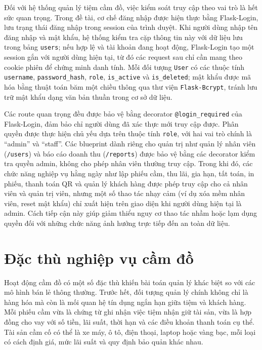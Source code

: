 \documentclass[13pt,a4paper]{extreport}
\begin{document}
Đối với hệ thống quản lý tiệm cầm đồ, việc kiểm soát truy cập theo vai trò là hết sức quan trọng. Trong đề tài, cơ chế đăng nhập được hiện thực bằng Flask-Login, lưu trạng thái đăng nhập trong session của trình duyệt. Khi người dùng nhập tên đăng nhập và mật khẩu, hệ thống kiểm tra cặp thông tin này với dữ liệu lưu trong bảng \texttt{users}; nếu hợp lệ và tài khoản đang hoạt động, Flask-Login tạo một session gắn với người dùng hiện tại, từ đó các request sau chỉ cần mang theo cookie phiên để chứng minh danh tính. Mỗi đối tượng \texttt{User} có các thuộc tính \texttt{username}, \texttt{password\_hash}, \texttt{role}, \texttt{is\_active} và \texttt{is\_deleted}; mật khẩu được mã hóa bằng thuật toán băm một chiều thông qua thư viện \texttt{Flask-Bcrypt}, tránh lưu trữ mật khẩu dạng văn bản thuần trong cơ sở dữ liệu.

Các route quan trọng đều được bảo vệ bằng decorator \texttt{@login\_required} của Flask-Login, đảm bảo chỉ người dùng đã xác thực mới truy cập được. Phân quyền được thực hiện chủ yếu dựa trên thuộc tính \texttt{role}, với hai vai trò chính là ``admin'' và ``staff''. Các blueprint dành riêng cho quản trị như quản lý nhân viên (\texttt{/users}) và báo cáo doanh thu (\texttt{/reports}) được bảo vệ bằng các decorator kiểm tra quyền admin, không cho phép nhân viên thường truy cập. Trong khi đó, các chức năng nghiệp vụ hằng ngày như lập phiếu cầm, thu lãi, gia hạn, tất toán, in phiếu, thanh toán QR và quản lý khách hàng được phép truy cập cho cả nhân viên và quản trị viên, nhưng một số thao tác nhạy cảm (ví dụ xóa mềm nhân viên, reset mật khẩu) chỉ xuất hiện trên giao diện khi người dùng hiện tại là admin. Cách tiếp cận này giúp giảm thiểu nguy cơ thao tác nhầm hoặc lạm dụng quyền đối với những chức năng ảnh hưởng trực tiếp đến an toàn dữ liệu.

\section{Đặc thù nghiệp vụ cầm đồ}

Hoạt động cầm đồ có một số đặc thù khiến bài toán quản lý khác biệt so với các mô hình bán lẻ thông thường. Trước hết, đối tượng quản lý chính không chỉ là hàng hóa mà còn là mối quan hệ tín dụng ngắn hạn giữa tiệm và khách hàng. Mỗi phiếu cầm vừa là chứng từ ghi nhận việc tiệm nhận giữ tài sản, vừa là hợp đồng cho vay với số tiền, lãi suất, thời hạn và các điều khoản thanh toán cụ thể. Tài sản cầm cố có thể là xe máy, ô tô, điện thoại, laptop hoặc vàng bạc, mỗi loại có cách định giá, mức lãi suất và quy định bảo quản khác nhau.
\end{document}
